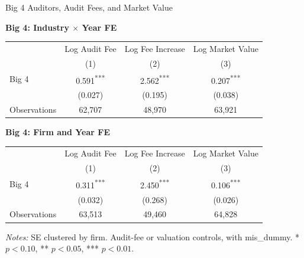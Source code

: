 \documentclass[10pt]{article}
\newcommand{\sym}[1]{\textsuperscript{#1}}
\begin{document}
\fontsize{10}{12}\selectfont
\setlength{\tabcolsep}{3pt}\renewcommand{\arraystretch}{1.15}
\begin{center}\large Big 4 Auditors, Audit Fees, and Market Value\end{center}
\medskip\textbf{Big 4: Industry $\times$ Year FE}\par\smallskip
\begin{tabular*}{\textwidth}{@{\extracolsep{\fill}}lccc@{}}
\toprule
 & Log Audit Fee & Log Fee Increase & Log Market Value \\
 & (1) & (2) & (3) \\
\midrule
Big 4 & 0.591\sym{***} & 2.562\sym{***} & 0.207\sym{***} \\
 & (0.027) & (0.195) & (0.038) \\
Observations & 62,707 & 48,970 & 63,921 \\
\bottomrule\end{tabular*}\par
\medskip\textbf{Big 4: Firm and Year FE}\par\smallskip
\begin{tabular*}{\textwidth}{@{\extracolsep{\fill}}lccc@{}}
\toprule
 & Log Audit Fee & Log Fee Increase & Log Market Value \\
 & (1) & (2) & (3) \\
\midrule
Big 4 & 0.311\sym{***} & 2.450\sym{***} & 0.106\sym{***} \\
 & (0.032) & (0.268) & (0.026) \\
Observations & 63,513 & 49,460 & 64,828 \\
\bottomrule\end{tabular*}\par
\medskip\fontsize{9}{11}\selectfont\textit{Notes:} SE clustered by firm. Audit-fee or valuation controls, with mis\_dummy. * $p<0.10$, ** $p<0.05$, *** $p<0.01$.
\end{document}
